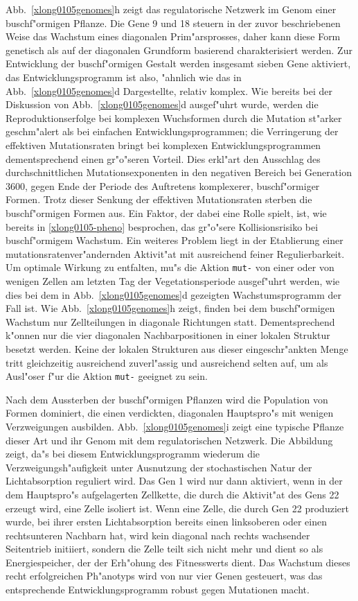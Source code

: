 Abb.\ \ref{xlong0105genomes}h zeigt das regulatorische Netzwerk im Genom einer buschf"ormigen Pflanze.
Die Gene 9 und 18 steuern in der zuvor beschriebenen Weise das Wachstum eines diagonalen Prim"arsprosses,
daher kann diese Form genetisch als auf der diagonalen Grundform basierend charakterisiert werden.
Zur Entwicklung der buschf"ormigen Gestalt werden insgesamt sieben Gene aktiviert, das Entwicklungsprogramm
ist also, "ahnlich wie das in Abb.\ \ref{xlong0105genomes}d Dargestellte, relativ komplex.
Wie bereits bei der Diskussion von Abb.\ \ref{xlong0105genomes}d ausgef"uhrt wurde, werden die
Reproduktionserfolge bei komplexen Wuchsformen durch die Mutation st"arker geschm"alert als bei
einfachen Entwicklungsprogrammen; die Verringerung der effektiven Mutationsraten bringt bei komplexen
Entwicklungsprogrammen dementsprechend einen gr"o"seren Vorteil. Dies erkl"art den Ausschlag des
durchschnittlichen Mutationsexponenten in den negativen Bereich bei Generation 3600, gegen Ende
der Periode des Auftretens komplexerer, buschf"ormiger Formen. Trotz dieser Senkung der effektiven
Mutationsraten sterben die buschf"ormigen Formen aus. Ein Faktor, der dabei eine Rolle spielt, ist,
wie bereits in \ref{xlong0105-pheno} besprochen, das gr"o"sere Kollisionsrisiko bei buschf"ormigem
Wachstum. Ein weiteres Problem liegt in der Etablierung einer mutationsratenver"andernden 
Aktivit"at mit ausreichend feiner Regulierbarkeit. Um optimale Wirkung zu entfalten, mu"s die
Aktion \verb|mut-| von einer oder von wenigen Zellen am letzten Tag der Vegetationsperiode
ausgef"uhrt werden, wie dies bei dem in Abb.\ \ref{xlong0105genomes}d gezeigten Wachstumsprogramm
der Fall ist. Wie Abb.\ \ref{xlong0105genomes}h zeigt, finden
bei dem buschf"ormigen Wachstum nur Zellteilungen in diagonale Richtungen statt. Dementsprechend
k"onnen nur die vier diagonalen Nachbarpositionen in einer lokalen Struktur besetzt werden.
Keine der lokalen Strukturen aus dieser eingeschr"ankten Menge tritt gleichzeitig ausreichend
zuverl"assig und ausreichend selten auf, um als Ausl"oser f"ur die Aktion \verb|mut-| geeignet zu sein.

Nach dem Aussterben der buschf"ormigen Pflanzen wird die Population von Formen dominiert, die einen
verdickten, diagonalen Hauptspro"s mit wenigen Verzweigungen ausbilden. Abb.\ \ref{xlong0105genomes}i
zeigt eine typische Pflanze dieser Art und ihr Genom mit dem regulatorischen Netzwerk. Die Abbildung
zeigt, da"s bei diesem Entwicklungsprogramm wiederum die Verzweigungsh"aufigkeit unter Ausnutzung der stochastischen
Natur der Lichtabsorption reguliert wird. Das Gen 1 wird nur dann aktiviert, wenn in der dem Hauptspro"s
aufgelagerten Zellkette, die durch die Aktivit"at des Gens 22 erzeugt wird, eine Zelle isoliert ist.
Wenn eine Zelle, die durch Gen 22 produziert wurde, bei ihrer ersten Lichtabsorption bereits einen
linksoberen oder einen rechtsunteren Nachbarn hat, wird kein diagonal nach rechts wachsender Seitentrieb
initiiert, sondern die Zelle teilt sich nicht mehr und dient so als Energiespeicher, der der Erh"ohung
des Fitnesswerts dient. Das Wachstum dieses recht erfolgreichen Ph"anotyps wird von nur vier Genen
gesteuert, was das entsprechende Entwicklungsprogramm robust gegen Mutationen macht.


